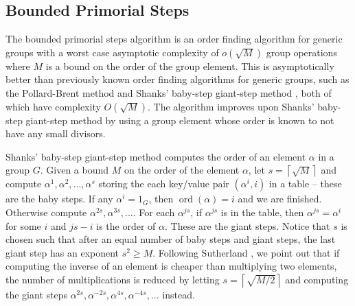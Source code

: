 \documentclass{ucalgthes1}
\theoremstyle{definition}
\DeclareMathOperator{\ord}{ord}
\newcommand{\ceil}[1]{\left\lceil #1 \right\rceil}
\begin{document}
\subsection{Bounded Primorial Steps}
\label{subsec:boundedPrimorialSteps}

The bounded primorial steps algorithm \cite{Sutherland2007} is an order finding algorithm for generic groups with a worst case asymptotic complexity of $o(\sqrt M)$ group operations where $M$ is a bound on the order of the group element.  This is asymptotically better than previously known order finding algorithms for generic groups, such as the Pollard-Brent method \cite{Brent1980} and Shanks' baby-step giant-step method \cite{Shanks1971}, both of which have complexity $O(\sqrt M)$.  The algorithm improves upon Shanks' baby-step giant-step method by using a group element whose order is known to not have any small divisors.

Shanks' baby-step giant-step method computes the order of an element $\alpha$ in a group $G$. Given a bound $M$ on the order of the element $\alpha$, let $s = \ceil{\sqrt{M}}$ and compute $\alpha^1, \alpha^2, ..., \alpha^s$ storing the each key/value pair $(\alpha^i, i)$ in a table -- these are the baby steps.  If any $\alpha^i = 1_G$, then $\ord(\alpha) = i$ and we are finished.  Otherwise compute $\alpha^{2s}, \alpha^{3s}, ...$.  For each $\alpha^{js}$, if $\alpha^{js}$ is in the table, then $\alpha^{js} = \alpha^i$ for some $i$ and $js - i$ is the order of $\alpha$.  These are the giant steps.  Notice that $s$ is chosen such that after an equal number of baby steps and giant steps, the last giant step has an exponent $s^2 \ge M$.  Following Sutherland \cite[p.50]{Sutherland2007}, we point out that if computing the inverse of an element is cheaper than multiplying two elements, the number of multiplications is reduced by letting $s = \ceil{\sqrt{M/2}}$ and computing the giant steps $\alpha^{2s}, \alpha^{-2s}, \alpha^{4s}, \alpha^{-4s}, ...$ instead.  



\end{document}

